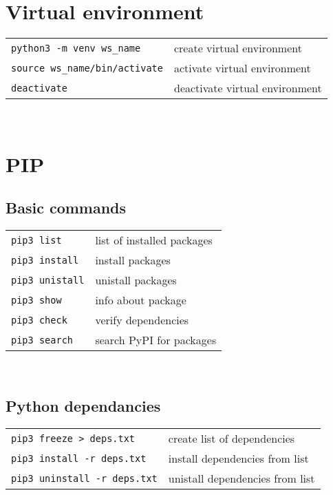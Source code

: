 
\section{Virtual environment}

    \begin{tabular}{@{}ll@{}}
        \verb!python3 -m venv ws_name!    & create virtual environment \\
        \verb!source ws_name/bin/activate!    & activate virtual environment \\
        \verb!deactivate!    & deactivate virtual environment \\
    \end{tabular} \\
        


\section{PIP}

    \subsection{Basic commands}

        \begin{tabular}{@{}ll@{}}
            \verb!pip3 list!    & list of installed packages \\
            \verb!pip3 install!    & install packages \\
            \verb!pip3 unistall!    & unistall packages \\
            \verb!pip3 show!    & info about package \\
            \verb!pip3 check!    & verify dependencies \\
            \verb!pip3 search!    & search PyPI for packages \\
        \end{tabular} \\
    
    \subsection{Python dependancies}
    
        \begin{tabular}{@{}ll@{}}
            \verb!pip3 freeze > deps.txt!    & create list of dependencies \\
            \verb!pip3 install -r deps.txt!    & install dependencies from list \\
            \verb!pip3 uninstall -r deps.txt!    & unistall dependencies from list \\
        \end{tabular} \\

